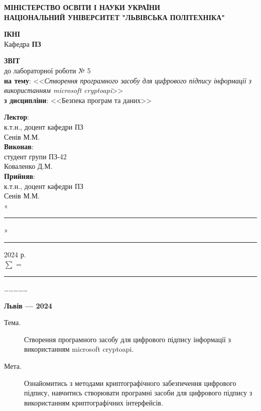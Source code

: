 \documentclass[oneside,14pt]{extarticle}
\newcommand\subject{Безпека програм та даних}
\newcommand\lecturer{к.т.н., доцент кафедри ПЗ\\Сенів М.М.}
\newcommand\teacher{к.т.н., доцент кафедри ПЗ\\Сенів М.М.}
\newcommand\mygroup{ПЗ-42}
\newcommand\lab{5}
\newcommand\theme{Створення програмного засобу для цифрового підпису інформації з використанням microsoft cryptoapi}
\newcommand\purpose{Ознайомитись з методами криптографічного забезпечення
	цифрового підпису, навчитись створювати програмні засоби для цифрового
	підпису з використанням криптографічних інтерфейсів}
\begin{document}
\begin{normalsize}
	\begin{titlepage}
		\thispagestyle{empty}
		\begin{center}
			\textbf{МІНІСТЕРСТВО ОСВІТИ І НАУКИ УКРАЇНИ\\
				НАЦІОНАЛЬНИЙ УНІВЕРСИТЕТ "ЛЬВІВСЬКА ПОЛІТЕХНІКА"}
		\end{center}
		\begin{flushright}
			\textbf{ІКНІ}\\
			Кафедра \textbf{ПЗ}
		\end{flushright}
		\vspace{80pt}
		\begin{center}
			\textbf{ЗВІТ}\\
			\vspace{10pt}
			до лабораторної роботи № \lab\\
			\textbf{на тему}: <<\textit{\theme}>>\\
			\textbf{з дисципліни}: <<\subject>>
		\end{center}
		\vspace{80pt}
		\begin{flushright}
			
			\textbf{Лектор}:\\
			\lecturer\\
			\vspace{28pt}
			\textbf{Виконав}:\\
			
			студент групи \mygroup\\
			Коваленко Д.М.\\
			\vspace{28pt}
			\textbf{Прийняв}:\\
			
			\teacher\\
			
			\vspace{28pt}
			«\rule{1cm}{0.15mm}» \rule{1.5cm}{0.15mm} 2024 р.\\
			$\sum$ = \rule{1cm}{0.15mm}……………\\
			
		\end{flushright}
		\vspace{\fill}
		\begin{center}
			\textbf{Львів — 2024}
		\end{center}
	\end{titlepage}
		
	\begin{description}
		\item[Тема.] \theme.
		\item[Мета.] \purpose.
	\end{description}


\end{normalsize}
\end{document}
